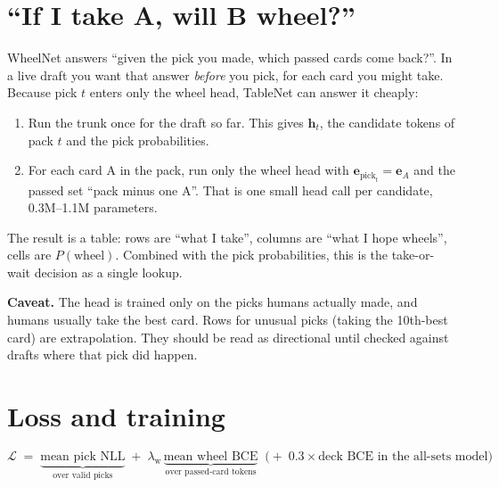 \documentclass[11pt,letterpaper]{article}
\begin{document}
\section{``If I take A, will B wheel?''}\label{sec:counterfactual}

WheelNet answers ``given the pick you made, which passed cards come back?''. In a live draft you want that
answer \emph{before} you pick, for each card you might take. Because pick $t$ enters only the wheel head,
TableNet can answer it cheaply:

\begin{enumerate}
\item Run the trunk once for the draft so far. This gives $\mathbf h_t$, the candidate tokens of pack
$t$ and the pick probabilities.
\item For each card A in the pack, run only the wheel head with $\mathbf e_{\text{pick}_t} = \mathbf e_A$
and the passed set ``pack minus one A''. That is one small head call per candidate, 0.3M--1.1M parameters.
\end{enumerate}

\noindent The result is a table: rows are ``what I take'', columns are ``what I hope wheels'', cells are
$P(\text{wheel})$. Combined with the pick probabilities, this is the take-or-wait decision as a single
lookup.

\noindent\textbf{Caveat.} The head is trained only on the picks humans actually made, and humans usually take
the best card. Rows for unusual picks (taking the 10th-best card) are extrapolation. They should be read as
directional until checked against drafts where that pick did happen.

\section{Loss and training}\label{sec:loss}

\[
\mathcal L \;=\; \underbrace{\text{mean pick NLL}}_{\text{over valid picks}}
\;+\; \lambda_{\text{w}}\,\underbrace{\text{mean wheel BCE}}_{\text{over passed-card tokens}}
\;\;\big(+\;0.3\times\text{deck BCE in the all-sets model}\big)
\]
\end{document}
